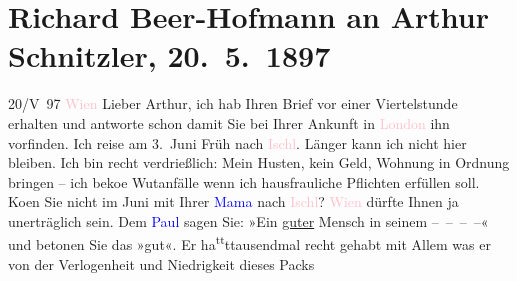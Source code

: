 

               \section[Richard Beer-Hofmann an Arthur Schnitzler, 20. 5. 1897]{ Richard Beer-Hofmann an Arthur Schnitzler,
                    20. 5. 1897}\nopagebreak{}\rehead{ }\normalsize\beginnumbering{} \toendnotes[C]{\smallbreak\pagebreak[2]} 
\toendnotes[C]{\smallbreak}\pstart
           \raggedleft{}{\pb}20/V 97{ }\textcolor{pink}{Wien}{}\ledrightnote{\textcolor{pink}{Wien}}\pend
           \pstart
           Lieber Arthur, ich hab Ihren Brief vor einer Viertelstunde
                    erhalten und antworte schon damit Sie bei Ihrer Ankunft in \textcolor{pink}{London}{}\ledrightnote{\textcolor{pink}{London}} ihn vorfinden. Ich reise am
                        3. Juni Früh nach \textcolor{pink}{Ischl}{}\ledrightnote{\textcolor{pink}{Bad Ischl}}.
                    Länger kann ich nicht hier bleiben. Ich bin {\pb}recht verdrießlich: Mein
                    Husten, kein Geld, Wohnung in Ordnung bringen – ich beko{\geminationm}e Wutanfälle wenn ich hausfrauliche Pflichten
                    erfüllen soll. Ko{\geminationm}en Sie nicht {\pb}im Juni mit
                    Ihrer \textcolor{blue}{Mama}{} nach \textcolor{pink}{Ischl}{}\ledrightnote{\textcolor{pink}{Bad Ischl}}? \textcolor{pink}{Wien}{}\ledrightnote{\textcolor{pink}{Wien}}
                    dürfte Ihnen ja unerträglich sein.\pend
           \pstart
           Dem \textcolor{blue}{Paul}{}\ledrightnote{\textcolor{blue}{Paul Goldmann}}
                sagen Sie: »Ein \uline{guter} Mensch in seinem – – – –« und betonen Sie
                    das »gut«. Er ha\substVorne{}\textsuperscript{tt}\substDazwischen{}t\substHinten{}{ }{\pb}tausendmal
                    recht gehabt mit Allem was er von der Verlogenheit und Niedrigkeit dieses Packs

